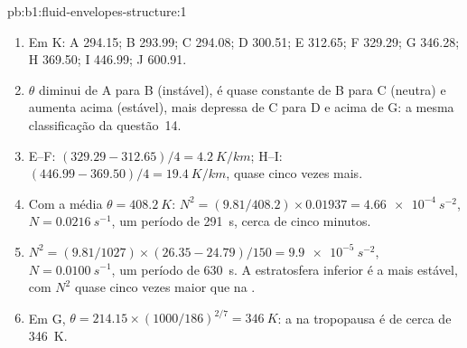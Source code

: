 \begin{solution}{pb:b1:fluid-envelopes-structure:1}
\begin{enumerate}
        que sua  seja uniforme, o que torna seu gradiente $\Gamma_d$; a
        inversão acima interrompe a mistura.
  \item Em K: A 294.15; B 293.99; C 294.08; D 300.51; E 312.65; F 329.29; G 346.28; H 369.50;
        I 446.99; J 600.91.
  \item $\theta$ diminui de A para B (instável), é quase constante de B para C (neutra) e aumenta
        acima (estável), mais depressa de C para D e acima de G: a mesma classificação da
        questão~14.
  \item E--F: $(329.29 - 312.65)/4 = \qty{4.2}{K/km}$; H--I: $(446.99 -
        369.50)/4 = \qty{19.4}{K/km}$, quase cinco vezes mais.
  \item Com a média $\theta = \qty{408.2}{K}$: $N^2 = (9.81/408.2) \times
        0.01937 = \qty{4.66e-4}{s^{-2}}$, $N = \qty{0.0216}{s^{-1}}$, um período de
        \qty{291}{s}, cerca de cinco minutos.
  \item $N^2 = (9.81/1027) \times (26.35 - 24.79)/150 = \qty{9.9e-5}{s^{-2}}$, $N = \qty{0.0100}{s^{-1}}$, um período de \qty{630}{s}. A estratosfera inferior é a mais estável,
        com $N^2$ quase cinco vezes maior que na .
  \item Em G, $\theta = 214.15 \times (1000/186)^{2/7} = \qty{346}{K}$: a  na
        tropopausa é de cerca de \qty{346}{K}.
\end{enumerate}
\end{solution}
